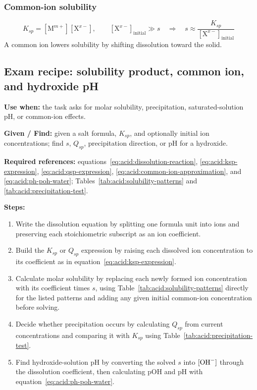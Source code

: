 \subsubsection{Common-ion solubility}
\begin{equation}
K_{sp}=[\mathrm{M}^{m+}][\mathrm{X}^{x-}], \qquad
[\mathrm{X}^{x-}]_{\mathrm{initial}}\gg s
\quad\Longrightarrow\quad
s\approx\frac{K_{sp}}{[\mathrm{X}^{x-}]_{\mathrm{initial}}}
\label{eq:acid:common-ion-approximation}
\end{equation}
A common ion lowers solubility by shifting dissolution toward the solid.

\subsection{Exam recipe: solubility product, common ion, and hydroxide pH}
\textbf{Use when:} the task asks for molar solubility, precipitation, saturated-solution pH, or common-ion effects.

\textbf{Given / Find:} given a salt formula, \(K_{sp}\), and optionally initial ion concentrations; find \(s\), \(Q_{sp}\), precipitation direction, or pH for a hydroxide.

\textbf{Required references:} equations~\eqref{eq:acid:dissolution-reaction}, \eqref{eq:acid:ksp-expression}, \eqref{eq:acid:qsp-expression}, \eqref{eq:acid:common-ion-approximation}, and \eqref{eq:acid:ph-poh-water}; Tables~\ref{tab:acid:solubility-patterns} and \ref{tab:acid:precipitation-test}.


\textbf{Steps:}
\begin{enumerate}
    \item Write the dissolution equation by splitting one formula unit into ions and preserving each stoichiometric subscript as an ion coefficient.
    \item Build the \(K_{sp}\) or \(Q_{sp}\) expression by raising each dissolved ion concentration to its coefficient as in equation~\eqref{eq:acid:ksp-expression}.
    \item Calculate molar solubility by replacing each newly formed ion concentration with its coefficient times \(s\), using Table~\ref{tab:acid:solubility-patterns} directly for the listed patterns and adding any given initial common-ion concentration before solving.
    \item Decide whether precipitation occurs by calculating \(Q_{sp}\) from current concentrations and comparing it with \(K_{sp}\) using Table~\ref{tab:acid:precipitation-test}.
    \item Find hydroxide-solution pH by converting the solved \(s\) into \([\ce{OH-}]\) through the dissolution coefficient, then calculating pOH and pH with equation~\eqref{eq:acid:ph-poh-water}.
\end{enumerate}


